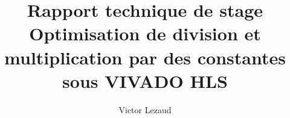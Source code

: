 \documentclass[10pt,a4paper,twoside]{article}
\author{Victor Lezaud}
\title{Rapport technique de stage\\ Optimisation de division et multiplication par des constantes sous VIVADO HLS}
\begin{document}
\maketitle
\renewcommand{\contentsname}{Sommaire}
\tableofcontents
\newpage




\end{document}
